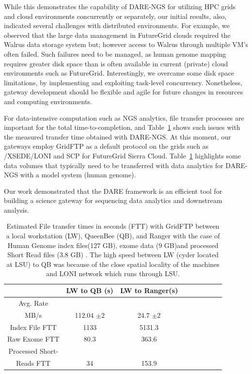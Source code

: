 \documentclass[]{svjour3}
\begin{document}
While this demonstrates the capability of DARE-NGS for utilizing HPC
grids and cloud environments concurrently or separately, our initial
results, also, indicated several challenges with distributed
environments. For example, we observed that the large data management
in FutureGrid clouds required the Walrus data storage system but;
however access to Walrus through multiple VM's often failed.  Such
failures need to be managed, as human genome mapping requires greater
disk space than is often available in current (private) cloud
environments such as FutureGrid. Interestingly, we overcame some disk
space limitations, by implementing and exploiting task-level
concurrency. Nonetheless, gateway development should be flexible and
agile for future changes in resources and computing environments.

For data-intensive computation such as NGS analytics, file transfer
processes are important for the total time-to-completion, and
Table~\ref{table:NGS-Distributed-file} shows such issues with the
measured transfer time obtained with DARE-NGS. At this moment, our
gateways employ GridFTP as a default protocol on the grids such as
/XSEDE/LONI and SCP for FutureGrid Sierra Cloud.
Table~\ref{table:NGS-Distributed-file} highlights some data volumes
that typically need to be transferred with data analytics for DARE-NGS
with a model system (human genome).



Our
work demonstrated that the DARE framework is an efficient tool for
building a science gateway for sequencing data analytics and
downstream analysis.

 \begin{table}
\centering
 \small
 \begin{tabular}{|c|c|c|c|c|c|c|c|c|} 
 \hline  
 	          & LW to QB (s)  & LW to Ranger(s) \\
 \hline                       
Avg. Rate && \\
MB/s & 112.04 $\pm 2$ &	    24.7 $\pm 2$  \\
 \hline                       
Index File	FTT & 1133  &	    5131.3      \\        
 \hline                       
Raw 	 Exome FTT&80.3 & 363.6\\                  
 \hline                       
Processed Short-&    & \\
Reads FTT&34&153.9  \\
 \hline                       
                    
\end{tabular}


\caption{Estimated File transfer times in seconds (FTT) with GridFTP between a local workstation (LW), QueenBee (QB), and Ranger with the case of Human Genome index files(127 GB), exome data (9 GB)and processed Short Read files (3.8 GB) . The high speed between LW (cyder located at LSU) to QB was because of the close spatial locality of the machines and LONI network which runs through LSU.  }

 \label{table:NGS-Distributed-file} 
\end{table}
\end{document}
